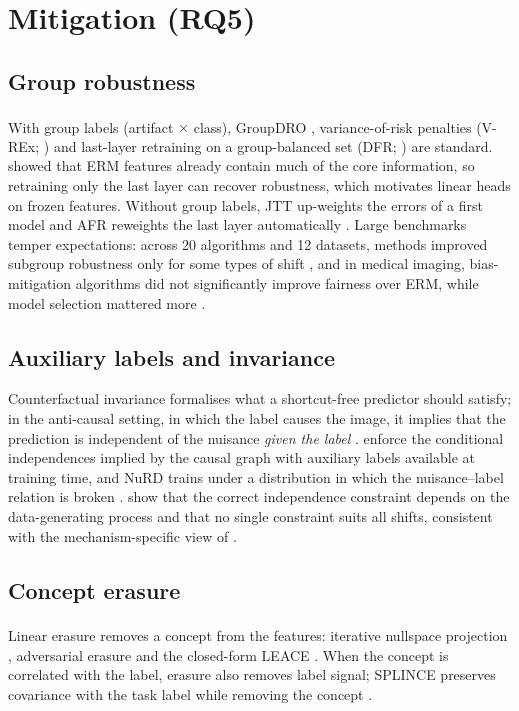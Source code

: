 \documentclass[11pt,a4paper]{article}
\newcommand{\bg}{\textsuperscript{\dag}}
\begin{document}
\section{Mitigation (RQ5)}\label{sec:mitigate}
\subsection{Group robustness}
With group labels (artifact $\times$ class), GroupDRO \citep{sagawa2020groupdro}\bg, variance-of-risk penalties
(V-REx; \citealp{krueger2021rex}) and last-layer retraining on a group-balanced set (DFR; \citealp{kirichenko2023dfr})
are standard. \citet{izmailov2022feature} showed that ERM features already contain much of the core information, so
retraining only the last layer can recover robustness, which motivates linear heads on frozen features. Without group
labels, JTT up-weights the errors of a first model \citep{liu2021jtt} and AFR reweights the last layer automatically
\citep{qiu2023afr}. Large benchmarks temper expectations: across 20 algorithms and 12 datasets, methods improved
subgroup robustness only for some types of shift \citep{yang2023change}, and in medical imaging, bias-mitigation
algorithms did not significantly improve fairness over ERM, while model selection mattered more
\citep{zong2023medfair}.

\subsection{Auxiliary labels and invariance}
Counterfactual invariance formalises what a shortcut-free predictor should satisfy; in the anti-causal setting, in
which the label causes the image, it implies that the prediction is independent of the nuisance \emph{given the label}
\citep{veitch2021counterfactual}. \citet{makar2022causally} enforce the conditional independences implied by the causal
graph with auxiliary labels available at training time, and NuRD trains under a distribution in which the
nuisance--label relation is broken \citep{puli2022nurd}. \citet{kaur2023modeling} show that the correct independence
constraint depends on the data-generating process and that no single constraint suits all shifts, consistent with the
mechanism-specific view of \citet{jones2024causal}.

\subsection{Concept erasure}
Linear erasure removes a concept from the features: iterative nullspace projection \citep{ravfogel2020inlp}\bg,
adversarial erasure \citep{ravfogel2022rlace} and the closed-form LEACE \citep{belrose2023leace}. When the concept is
correlated with the label, erasure also removes label signal; SPLINCE preserves covariance with the task label while
removing the concept \citep{holstege2025splince}.
\end{document}
